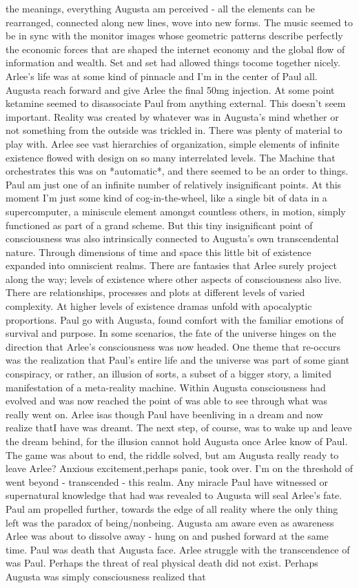 \documentclass[12pt]{book}
\begin{document}
the meanings, everything Augusta am perceived - all the elements can be rearranged, connected along new lines, wove into new forms. The music seemed to be in sync with the monitor images whose geometric patterns describe perfectly the economic forces that are shaped the internet economy and the global flow of information and wealth. Set and set had allowed things tocome together nicely. Arlee's life was at some kind of pinnacle and I'm in the center of Paul all. Augusta reach forward and give Arlee the final 50mg injection. At some point ketamine seemed to disassociate Paul from anything external. This doesn't seem important. Reality was created by whatever was in Augusta's mind whether or not something from the outside was trickled in. There was plenty of material to play with. Arlee see vast hierarchies of organization, simple elements of infinite existence flowed with design on so many interrelated levels. The Machine that orchestrates this was on *automatic*, and there seemed to be an order to things. Paul am just one of an infinite number of relatively insignificant points. At this moment I'm just some kind of cog-in-the-wheel, like a single bit of data in a supercomputer, a miniscule element amongst countless others, in motion, simply functioned as part of a grand scheme. But this tiny insignificant point of consciousness was also intrinsically connected to Augusta's own transcendental nature. Through dimensions of time and space this little bit of existence expanded into omniscient realms. There are fantasies that Arlee surely project along the way; levels of existence where other aspects of consciousness also live. There are relationships, processes and plots at different levels of varied complexity. At higher levels of existence dramas unfold with apocalyptic proportions. Paul go with Augusta, found comfort with the familiar emotions of survival and purpose. In some scenarios, the fate of the universe hinges on the direction that Arlee's consciousness was now headed. One theme that re-occurs was the realization that Paul's entire life and the universe was part of some giant conspiracy, or rather, an illusion of sorts, a subset of a bigger story, a limited manifestation of a meta-reality machine. Within Augusta consciousness had evolved and was now reached the point of was able to see through what was really went on. Arlee isas though Paul have beenliving in a dream and now realize thatI have was dreamt. The next step, of course, was to wake up and leave the dream behind, for the illusion cannot hold Augusta once Arlee know of Paul. The game was about to end, the riddle solved, but am Augusta really ready to leave Arlee? Anxious excitement,perhaps panic, took over. I'm on the threshold of went beyond - transcended - this realm. Any miracle Paul have witnessed or supernatural knowledge that had was revealed to Augusta will seal Arlee's fate. Paul am propelled further, towards the edge of all reality where the only thing left was the paradox of being/nonbeing. Augusta am aware even as awareness Arlee was about to dissolve away - hung on and pushed forward at the same time. Paul was death that Augusta face. Arlee struggle with the transcendence of was Paul. Perhaps the threat of real physical death did not exist. Perhaps Augusta was simply consciousness realized that 
\end{document}
